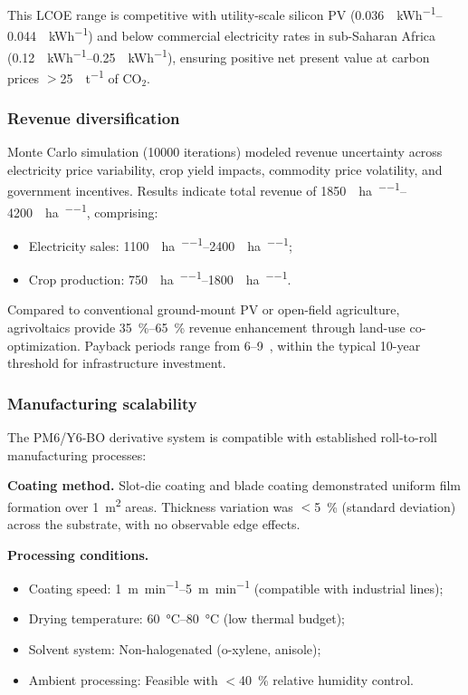 This LCOE range is competitive with utility-scale silicon PV (\SIrange{0.036}{0.044}{\USD\per\kWh}) and below commercial electricity rates in sub-Saharan Africa (\SIrange{0.12}{0.25}{\USD\per\kWh}), ensuring positive net present value at carbon prices $>$\SI{25}{\USD\per\tonne} of CO$_2$.

\subsubsection{Revenue diversification}

Monte Carlo simulation (\num{10000} iterations) modeled revenue uncertainty across electricity price variability, crop yield impacts, commodity price volatility, and government incentives. Results indicate total revenue of \SIrange{1850}{4200}{\USD\per\hectare\per\yr}, comprising:
\begin{itemize}
    \item Electricity sales: \SIrange{1100}{2400}{\USD\per\hectare\per\yr};
    \item Crop production: \SIrange{750}{1800}{\USD\per\hectare\per\yr}.
\end{itemize}

Compared to conventional ground-mount PV or open-field agriculture, agrivoltaics provide \SIrange{35}{65}{\percent} revenue enhancement through land-use co-optimization. Payback periods range from \numrange{6}{9}~\si{\yr}, within the typical 10-year threshold for infrastructure investment.

\subsubsection{Manufacturing scalability}

The PM6/Y6-BO derivative system is compatible with established roll-to-roll manufacturing processes:

\textbf{Coating method.} Slot-die coating and blade coating demonstrated uniform film formation over \SI{1}{\meter\squared} areas. Thickness variation was $<$\SI{5}{\percent} (standard deviation) across the substrate, with no observable edge effects.

\textbf{Processing conditions.}
\begin{itemize}
    \item Coating speed: \SIrange{1}{5}{\meter\per\minute} (compatible with industrial lines);
    \item Drying temperature: \SIrange{60}{80}{\degreeCelsius} (low thermal budget);
    \item Solvent system: Non-halogenated (o-xylene, anisole);
    \item Ambient processing: Feasible with $<$\SI{40}{\percent} relative humidity control.
\end{itemize}

